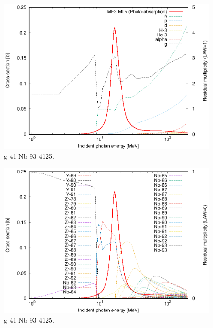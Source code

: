 \begin{figure}
 \includegraphics[width=\linewidth]{eps/g_41-Nb-93_4125.eps}
  \caption{g-41-Nb-93-4125.}
\end{figure}
\begin{figure}
 \includegraphics[width=\linewidth]{eps-law0/g_41-Nb-93_4125.eps}
 \caption{g-41-Nb-93-4125.}
\end{figure}
\newpage \clearpage

